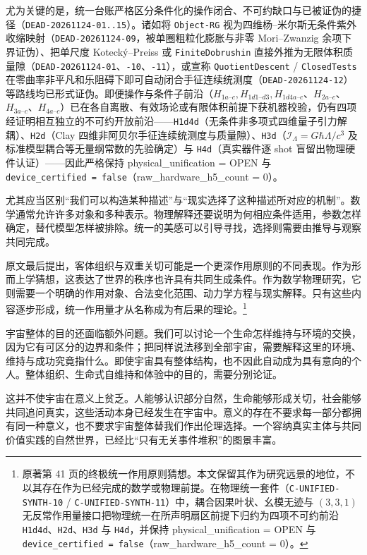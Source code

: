 \documentclass[
  11pt,
  oneside]{book}
\begin{document}
尤为关键的是，统一台账严格区分条件化的操作闭合、不可约缺口与已被证伪的捷径（\texttt{DEAD-20261124-01..15}）。诸如将 \texttt{Object-RG} 视为四维杨--米尔斯无条件紫外收缩映射（\texttt{DEAD-20261124-09}，被单圈粗粒化膨胀与非零 Mori--Zwanzig 余项下界证伪）、把单尺度 Kotecký--Preiss 或 \texttt{FiniteDobrushin} 直接外推为无限体积质量隙（\texttt{DEAD-20261124-01}、\texttt{-10}、\texttt{-11}），或宣称 \texttt{QuotientDescent} / \texttt{ClosedTests} 在零曲率非平凡和乐阻碍下即可自动闭合手征连续统测度（\texttt{DEAD-20261124-12}）等路线均已形式证伪。即便操作与条件子前沿（\(H_{1a\text{--}c}, H_{1d1\text{--}d3}, H_{1d4a\text{--}c}\)、\(H_{2a\text{--}c}\)、\(H_{3a\text{--}c}\)、\(H_{4a\text{--}c}\)）已在各自离散、有效场论或有限体积前提下获机器校验，仍有四项经证明相互独立的不可约开放前沿------\texttt{H1d4d}（无条件非多项式四维量子引力解耦）、\texttt{H2d}（Clay 四维非阿贝尔手征连续统测度与质量隙）、\texttt{H3d}（\(\mathcal{I}_\Lambda = G\hbar\Lambda/c^3\) 及标准模型耦合等无量纲常数的先验确定）与 \texttt{H4d}（真实器件逐 shot 盲留出物理硬件认证）------因此严格保持 physical\_unification = OPEN 与 \texttt{device\_certified\ =\ false}（raw\_hardware\_h5\_count = 0）。

尤其应当区别``我们可以构造某种描述''与``现实选择了这种描述所对应的机制''。数学通常允许许多对象和多种表示。物理解释还要说明为何相应条件适用，参数怎样确定，替代模型怎样被排除。统一的美感可以引导寻找，选择则需要由推导与观察共同完成。

原文最后提出，客体组织与双重关切可能是一个更深作用原则的不同表现。作为形而上学猜想，这表达了世界的秩序也许具有共同生成条件。作为数学物理研究，它则需要一个明确的作用对象、合法变化范围、动力学方程与现实解释。只有这些内容逐步形成，统一作用量才从名称成为有后果的理论。\footnote{\hypertarget{ph-note-66}{}原著第 41 页的终极统一作用原则猜想。本文保留其作为研究远景的地位，不以其存在作为已经完成的数学或物理前提。在物理统一套件（\texttt{C-UNIFIED-SYNTH-10} / \texttt{C-UNIFIED-SYNTH-11}）中，耦合因果叶状、幺模无迹与 \((3,3,1)\) 无反常作用量接口把物理统一在所声明扇区前提下归约为四项不可约前沿 \texttt{H1d4d}、\texttt{H2d}、\texttt{H3d} 与 \texttt{H4d}，并保持 physical\_unification = OPEN 与 \texttt{device\_certified\ =\ false}（raw\_hardware\_h5\_count = 0）。}

宇宙整体的目的还面临额外问题。我们可以讨论一个生命怎样维持与环境的交换，因为它有可区分的边界和条件；把同样说法移到全部宇宙，需要解释这里的环境、维持与成功究竟指什么。即使宇宙具有整体结构，也不因此自动成为具有意向的个人。整体组织、生命式自维持和体验中的目的，需要分别论证。

这并不使宇宙在意义上贫乏。人能够认识部分自然，生命能够形成关切，社会能够共同追问真实，这些活动本身已经发生在宇宙中。意义的存在不要求每一部分都拥有同一种意义，也不要求宇宙整体替我们作出伦理选择。一个容纳真实主体与共同价值实践的自然世界，已经比``只有无关事件堆积''的图景丰富。
\end{document}
